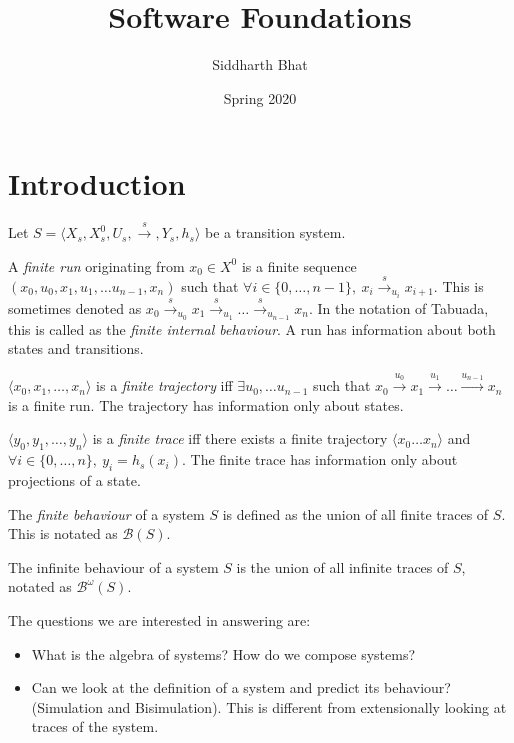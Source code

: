 \documentclass[11pt]{book}
\title{Software Foundations}
\author{Siddharth Bhat}
\date{Spring 2020}
\newcommand{\B}{\ensuremath{\mathcal{B}}}
\newcommand{\Bomega}{\ensuremath{\mathcal{B}^\omega}}
\begin{document}
\maketitle
\tableofcontents

\chapter{Introduction}

Let $S = \langle X_s, X_s^0, U_s, \xrightarrow{s}, Y_s, h_s \rangle$ be
a transition system.

A \emph{finite run} originating from $x_0 \in X^0$  is a finite sequence
$(x_0, u_0, x_1, u_1, \dots u_{n-1}, x_n)$ such that $\forall i \in \{0, \dots, n-1\},~ x_i \xrightarrow{s}_{u_i} x_{i+1}$.
This is sometimes denoted as $x_0 \xrightarrow{s}_{u_0} x_1 \xrightarrow{s}_{u_1} \dots \xrightarrow{s}_{u_{n-1}} x_n$.
In the notation of Tabuada, this is called as the \emph{finite internal behaviour}.
A run has information about both states and transitions.

$\langle x_0, x_1, \dots, x_n \rangle$ is a \emph{finite trajectory} iff
$\exists u_0, \dots u_{n-1}$ such that $x_0 \xrightarrow{u_0} x_1 \xrightarrow{u_1} \dots \xrightarrow{u_{n-1}} x_n$
is a finite run. The trajectory has information only about states.

$\langle y_0, y_1, \dots, y_n \rangle$ is a \emph{finite trace} iff
there exists a finite trajectory $\langle x_0 \dots x_n \rangle$ and
$\forall i \in \{0, \dots, n \}, ~y_i = h_s(x_i)$. The finite trace has 
information only about projections of a state.

The \emph{finite behaviour} of a system $S$ is defined as the union of all
finite traces of $S$. This is notated as $\B(S)$.

The infinite behaviour of a system $S$ is the union of all infinite traces
of $S$, notated as $\Bomega(S)$.

The questions we are interested in answering are:
\begin{itemize}
    \item What is the algebra of systems? How do we compose systems?
    \item Can we look at the definition of a system and predict its behaviour?
        (Simulation and Bisimulation). This is different from extensionally
        looking at traces of the system.
\end{itemize}
\end{document}
